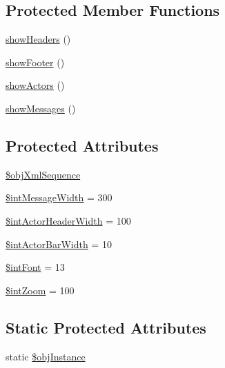 \subsection*{Protected Member Functions}
\begin{CompactItemize}
\item 
\hyperlink{class_xml_sequence_printer_diagram_82d9e10e8180da3641b19222fb093328}{showHeaders} ()
\item 
\hyperlink{class_xml_sequence_printer_diagram_127a1d8b6c21e8271a4332b35923145b}{showFooter} ()
\item 
\hyperlink{class_xml_sequence_printer_diagram_2ed8b419d64f2238d2d47beda376f1f7}{showActors} ()
\item 
\hyperlink{class_xml_sequence_printer_diagram_814ab9f67831bd1af317490a9dfaa08a}{showMessages} ()
\end{CompactItemize}
\subsection*{Protected Attributes}
\begin{CompactItemize}
\item 
\hyperlink{class_xml_sequence_printer_diagram_eefa469c1b13fe1fec040c910b720034}{\$objXmlSequence}
\item 
\hyperlink{class_xml_sequence_printer_diagram_f4e5f808b32b93258056fa0c4437d470}{\$intMessageWidth} = 300
\item 
\hyperlink{class_xml_sequence_printer_diagram_61569050eaee6df3ed706f6f41c99f67}{\$intActorHeaderWidth} = 100
\item 
\hyperlink{class_xml_sequence_printer_diagram_f5c27ba6bcbf27e2cf3b05bdf20dcbe4}{\$intActorBarWidth} = 10
\item 
\hyperlink{class_xml_sequence_printer_diagram_0ac1397d841f92d6140ea863c0eb2171}{\$intFont} = 13
\item 
\hyperlink{class_xml_sequence_printer_diagram_ba837fb08baf5fbca04d8237a589e93e}{\$intZoom} = 100
\end{CompactItemize}
\subsection*{Static Protected Attributes}
\begin{CompactItemize}
\item 
static \hyperlink{class_xml_sequence_printer_diagram_917d057900327b25608ed26c927eac3b}{\$objInstance}
\end{CompactItemize}



